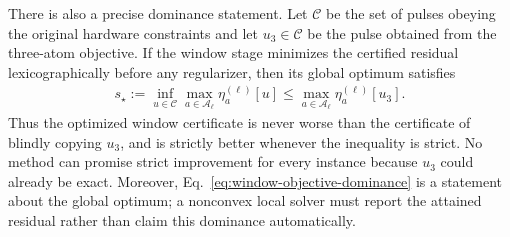 There is also a precise dominance statement.  Let $\mathcal C$ be the set of
pulses obeying the original hardware constraints and let $u_3\in\mathcal C$
be the pulse obtained from the three-atom objective.  If the window stage
minimizes the certified residual lexicographically before any regularizer,
then its global optimum satisfies
\begin{align}
s_\star
:=\inf_{u\in\mathcal C}\max_{a\in\mathcal A_\ell}\eta_a^{(\ell)}[u]
\leq
\max_{a\in\mathcal A_\ell}\eta_a^{(\ell)}[u_3].
\label{eq:window-objective-dominance}
\end{align}
Thus the optimized window certificate is never worse than the certificate of
blindly copying $u_3$, and is strictly better whenever the inequality is
strict.  No method can promise strict improvement for every instance because
$u_3$ could already be exact.  Moreover,
Eq.~\eqref{eq:window-objective-dominance} is a statement about the global
optimum; a nonconvex local solver must report the attained residual rather
than claim this dominance automatically.

